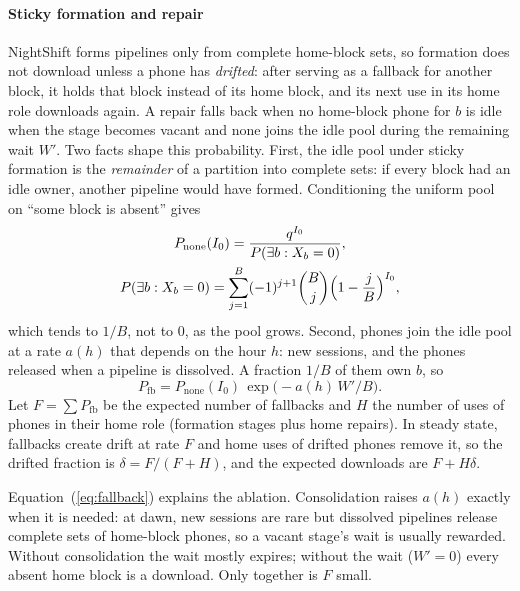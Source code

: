 \documentclass[preprint,review,12pt,authoryear]{elsarticle}
\begin{document}
\paragraph{Sticky formation and repair} NightShift forms pipelines only from
complete home-block sets, so formation does not download unless a phone has
\emph{drifted}: after serving as a fallback for another block, it holds that
block instead of its home block, and its next use in its home role downloads
again. A repair falls back when no home-block phone for $b$ is idle when the
stage becomes vacant and none joins the idle pool during the remaining wait
$W'$. Two facts shape this probability. First, the idle pool under sticky
formation is the \emph{remainder} of a partition into complete sets: if every
block had an idle owner, another pipeline would have formed. Conditioning the
uniform pool on ``some block is absent'' gives
\begin{equation}
\begin{gathered}
P_{\text{none}}(I_0) = \frac{q^{I_0}}{P(\exists b: X_b = 0)},\\
P(\exists b: X_b=0) = \sum_{j=1}^{B} (-1)^{j+1}\binom{B}{j}\Bigl(1-\frac{j}{B}\Bigr)^{I_0},
\end{gathered}
\label{eq:none}
\end{equation}
which tends to $1/B$, not to 0, as the pool grows. Second, phones join the idle
pool at a rate $a(h)$ that depends on the hour $h$: new sessions, and the
phones released when a pipeline is dissolved. A fraction $1/B$ of them own $b$,
so
\begin{equation}
P_{\text{fb}} = P_{\text{none}}(I_0)\, \exp\bigl(-a(h)\, W'/B\bigr).
\label{eq:fallback}
\end{equation}
Let $F=\sum P_{\text{fb}}$ be the expected number of fallbacks and $H$ the
number of uses of phones in their home role (formation stages plus home
repairs). In steady state, fallbacks create drift at rate $F$ and home uses of
drifted phones remove it, so the drifted fraction is $\delta = F/(F+H)$, and the
expected downloads are $F + H\delta$.

Equation~(\ref{eq:fallback}) explains the ablation. Consolidation raises $a(h)$
exactly when it is needed: at dawn, new sessions are rare but dissolved
pipelines release complete sets of home-block phones, so a vacant stage's wait
is usually rewarded. Without consolidation the wait mostly expires; without
the wait ($W'=0$) every absent home block is a download. Only together is $F$
small.
\end{document}

